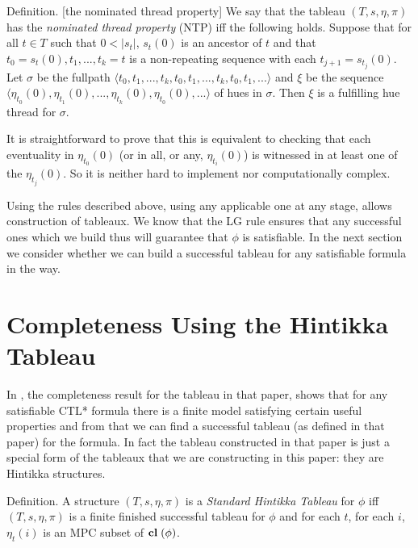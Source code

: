 \documentclass[submission,copyright,creativecommons]{eptcs}
\newcommand{\clos}{\mbox{{\bf cl}}\;}
\newenvironment{definition}{Definition. }{}
\begin{document}
\begin{definition}[the nominated thread property]
We say that the tableau $(T,s,\eta,\pi)$
has the {\em nominated thread property}
(NTP) iff the following holds.
Suppose that
for all $t \in T$ such that $0<|s_t|$, $s_t(0)$ is an
ancestor of $t$
and that $t_0=s_t(0), t_1, ..., t_k=t$
is a non-repeating sequence with each
 $t_{j+1}=s_{t_j}(0)$.
 Let $\sigma$ be the fullpath
 $\langle t_0, t_1, ..., t_k, t_0, t_1, ..., t_k, t_0, t_1, ... \rangle$
 and
 $\xi$ be the sequence
 $
 \langle \eta_{t_0}(0), \eta_{t_1}(0), ..., \eta_{t_k}(0), 
\eta_{t_0}(0), ... \rangle
 $
 of hues in $\sigma$.
Then $\xi$ is a fulfilling hue thread for $\sigma$.
\end{definition}

It is straightforward to prove that this
is equivalent to checking
that
each eventuality in $\eta_{t_0}(0)$
(or in all, or any, $\eta_{t_i}(0)$)
is witnessed in at least one of the $\eta_{t_j}(0)$.
So it is neither hard 
to implement nor computationally complex.

Using the rules described above,
using any applicable one at any stage,
allows construction
of 
tableaux.
We know that the LG rule ensures that 
any successful ones which we build thus
will guarantee that $\phi$ is
satisfiable.
In the next section we consider
whether we can build a successful tableau
for any satisfiable formula
in the way.


\section{Completeness Using the Hintikka Tableau}
\label{sec:completeness}

In \cite{Rey:startab}, the completeness result for the tableau
in that paper, shows that for
any satisfiable CTL* formula
 there is a finite model 
satisfying certain useful properties 
and 
from that we can find a successful tableau (as defined in that paper)
for the formula.
In fact the tableau constructed in that paper is just a special
form of the tableaux that we are constructing in this paper:
they are Hintikka structures.

\begin{definition}
\label{def:sht}
A structure $(T,s,\eta,\pi)$ is a
{\em Standard Hintikka Tableau} for $\phi$
iff
$(T,s,\eta,\pi)$ is a finite
finished successful tableau for $\phi$
and
for each $t$,
for each $i$,
$\eta_t(i)$ is an MPC subset 
of $\clos(\phi)$.
\end{definition}
\end{document}
